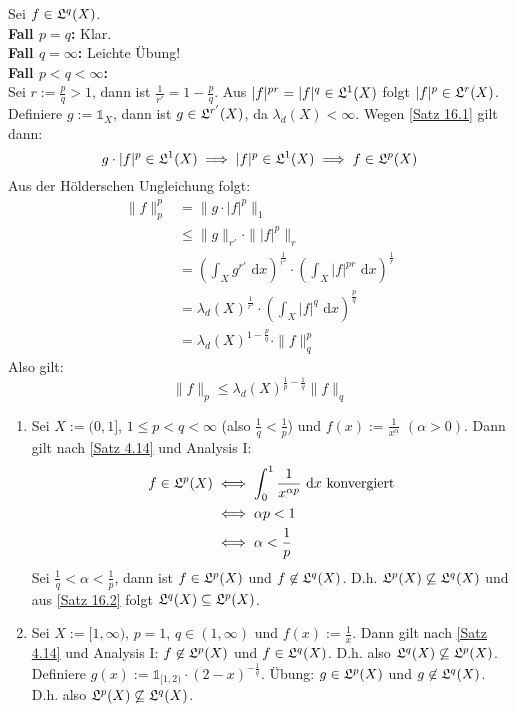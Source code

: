 \documentclass[a4paper,twoside,DIV15,BCOR12mm,chapterprefix=true,headings=onelinechapter]{scrbook}
\begin{document}
\begin{beweis}
Sei $f\in\mathfrak{L}^q(X)$.\\
\textbf{Fall $p=q$:} Klar.\\
\textbf{Fall $q=\infty$:} Leichte Übung!\\
\textbf{Fall $p<q<\infty$:}\\
Sei $r:=\frac pq>1$, dann ist $\frac 1{r'}=1-\frac pq$. Aus $|f|^{pr}=|f|^q\in\mathfrak{L}^1(X)$ folgt $|f|^p\in\mathfrak{L}^r(X)$. Definiere $g:=\mathds{1}_X$, dann ist $g\in\mathfrak{L}^{r'}(X)$, da $\lambda_d(X)<\infty$. Wegen \ref{Satz 16.1} gilt dann:
\[g\cdot|f|^p\in\mathfrak{L}^1(X)\implies |f|^p\in\mathfrak{L}^1(X)\implies f\in\mathfrak{L}^p(X)\]
Aus der Hölderschen Ungleichung folgt:
\begin{align*}
\|f\|^p_p&=\|g\cdot |f|^p\|_1\\
&\le \|g\|_{r'}\cdot\||f|^p\|_r\\
&= (\int_X g^{r'}\text{ d}x)^{\frac 1{r'}}\cdot(\int_X |f|^{pr}\text{ d}x)^{\frac 1r}\\
&= \lambda_d(X)^{\frac1{r'}}\cdot(\int_X |f|^{q}\text{ d}x)^{\frac pq}\\
&= \lambda_d(X)^{1-\frac pq}\cdot\|f\|^p_q
\end{align*}
Also gilt:
\[\|f\|_p\le\lambda_d(X)^{\frac1p-\frac1q}\|f\|_q\]
\end{beweis}

\begin {beispiel}
\begin{enumerate}
\item Sei $X:=(0,1]$, $1\le p<q<\infty$ (also $\frac 1q<\frac1p$) und $f(x):=\frac 1{x^\alpha}$ $(\alpha>0)$. Dann gilt nach 
\ref{Satz 4.14} und Analysis I:
\begin{align*}
f\in\mathfrak{L}^p(X)&\iff\int_0^1\frac1{x^{\alpha p}}\text{ d}x \text{ konvergiert}\\
&\iff\alpha p<1\\
&\iff \alpha<\frac 1p
\end{align*}
Sei $\frac 1q<\alpha<\frac 1p$, dann ist $f\in\mathfrak{L}^p(X)$ und $f\not\in\mathfrak{L}^q(X)$. D.h. $\mathfrak{L}^p(X)\not\subseteq\mathfrak{L}^q(X)$ und aus \ref{Satz 16.2} folgt $\mathfrak{L}^q(X)\subseteq\mathfrak{L}^p(X)$.
\item Sei $X:=[1,\infty)$, $p=1$, $q\in(1,\infty)$ und $f(x):=\frac 1x$. Dann gilt nach \ref{Satz 4.14} und Analysis I: $f\not\in\mathfrak{L}^p(X)$ und $f\in\mathfrak{L}^q(X)$. D.h. also $\mathfrak{L}^q(X)\not\subseteq\mathfrak{L}^p(X)$.\\
Definiere $g(x):=\mathds{1}_{[1,2)}\cdot (2-x)^{-\frac 1q}$. Übung: $g\in\mathfrak{L}^p(X)$ und $g\not\in\mathfrak{L}^q(X)$. D.h. also $\mathfrak{L}^p(X)\not\subseteq\mathfrak{L}^q(X)$.
\end{enumerate}
\end{beispiel}
\end{document}
